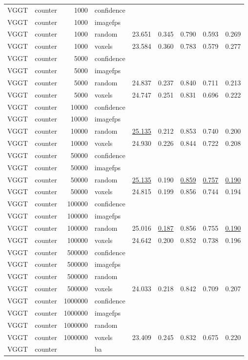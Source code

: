 \begin{table}[H]
\begin{tabular}{llrlrrrrr}
VGGT & counter & 1000 & confidence &  &  &  &  &  \\
VGGT & counter & 1000 & imagefps &  &  &  &  &  \\
VGGT & counter & 1000 & random & 23.651 & 0.345 & 0.790 & 0.593 & 0.269 \\
VGGT & counter & 1000 & voxels & 23.584 & 0.360 & 0.783 & 0.579 & 0.277 \\
VGGT & counter & 5000 & confidence &  &  &  &  &  \\
VGGT & counter & 5000 & imagefps &  &  &  &  &  \\
VGGT & counter & 5000 & random & 24.837 & 0.237 & 0.840 & 0.711 & 0.213 \\
VGGT & counter & 5000 & voxels & 24.747 & 0.251 & 0.831 & 0.696 & 0.222 \\
VGGT & counter & 10000 & confidence &  &  &  &  &  \\
VGGT & counter & 10000 & imagefps &  &  &  &  &  \\
VGGT & counter & 10000 & random & \underline{25.135} & 0.212 & 0.853 & 0.740 & 0.200 \\
VGGT & counter & 10000 & voxels & 24.930 & 0.226 & 0.844 & 0.722 & 0.208 \\
VGGT & counter & 50000 & confidence &  &  &  &  &  \\
VGGT & counter & 50000 & imagefps &  &  &  &  &  \\
VGGT & counter & 50000 & random & \underline{25.135} & 0.190 & \underline{0.859} & \underline{0.757} & \underline{0.190} \\
VGGT & counter & 50000 & voxels & 24.815 & 0.199 & 0.856 & 0.744 & 0.194 \\
VGGT & counter & 100000 & confidence &  &  &  &  &  \\
VGGT & counter & 100000 & imagefps &  &  &  &  &  \\
VGGT & counter & 100000 & random & 25.016 & \underline{0.187} & 0.856 & 0.755 & \underline{0.190} \\
VGGT & counter & 100000 & voxels & 24.642 & 0.200 & 0.852 & 0.738 & 0.196 \\
VGGT & counter & 500000 & confidence &  &  &  &  &  \\
VGGT & counter & 500000 & imagefps &  &  &  &  &  \\
VGGT & counter & 500000 & random &  &  &  &  &  \\
VGGT & counter & 500000 & voxels & 24.033 & 0.218 & 0.842 & 0.709 & 0.207 \\
VGGT & counter & 1000000 & confidence &  &  &  &  &  \\
VGGT & counter & 1000000 & imagefps &  &  &  &  &  \\
VGGT & counter & 1000000 & random &  &  &  &  &  \\
VGGT & counter & 1000000 & voxels & 23.409 & 0.245 & 0.832 & 0.675 & 0.220 \\
VGGT & counter &  & ba &  &  &  &  &  \\
\bottomrule
\end{tabular}
\end{table}